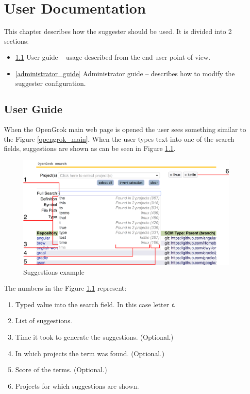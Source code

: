 \chapter{User Documentation}
\label{chap:user}

This chapter describes how the suggester should be used. It is divided into 2 sections:
\begin{itemize}
    \item \ref{user_guide} User guide – usage described from the end user point of view.
    \item \ref{administrator_guide} Administrator guide – describes how to modify the suggester configuration.
\end{itemize}

\section{User Guide}
\label{user_guide}
When the OpenGrok main web page is opened the user sees something similar to the Figure \ref{opengrok_main}.
When the user types text into one of the search fields, suggestions are shown as can be seen in Figure \ref{suggestions_pic}.

\begin{figure}[htbp]
    \centering
    \includegraphics[width=145mm]{../img/suggestions_pic.png}
    \caption{Suggestions example}
    \label{suggestions_pic}
\end{figure}

The numbers in the Figure \ref{suggestions_pic} represent:
\begin{enumerate}
    \item Typed value into the search field. In this case letter \textit{t}.
    \item List of suggestions.
    \item Time it took to generate the suggestions. (Optional.)
    \item In which projects the term was found. (Optional.)
    \item Score of the terms. (Optional.)
    \item Projects for which suggestions are shown.
\end{enumerate}

